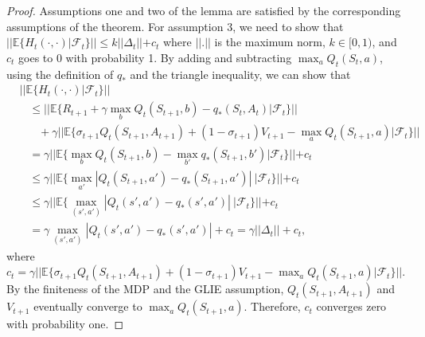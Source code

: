 \begin{proof}
Assumptions one and two of the lemma are satisfied by the corresponding assumptions of the theorem.
For assumption 3, we need to show that $||\mathbb{E}\{ H_t (\cdot, \cdot) | \mathcal{F}_t \}|| \leq k ||\Delta_t|| + c_t$ where $||.||$ is the maximum norm, $k \in [0,1)$, and $c_t$ goes to $0$ with probability 1. 
By adding and subtracting $\max_a Q_t(S_t,a)$, using the definition of $q_*$ and the triangle inequality, we can show that
%
\begin{align}
\label{eq:onestep_contraction_equation}
& ||\mathbb{E}\{H_t (\cdot, \cdot) | \mathcal{F}_t\}|| 
	\nonumber \\  
& \hspace{10pt} \leq 
	|| \mathbb{E}\{R_{t+1} + \gamma \max_{b} Q_{t}(S_{t+1}, b) - q_*(S_t,A_t)
	| \mathcal{F}_t \}|| 
    \nonumber \\
& \hspace{20pt} 
	+ \gamma || \mathbb{E}\{\sigma_{t+1} Q_t(S_{t+1}, A_{t+1}) + (1-\sigma_{t+1})V_{t+1} 
	- \max_a Q_{t}(S_{t+1},a) | \mathcal{F}_t \}|| 
    \nonumber \\
& \hspace{10pt} = 
	\gamma || \mathbb{E}\{\max_b Q_t(S_{t+1}, b) - \max_{b'} q_*(S_{t+1}, b') 
	| \mathcal{F}_t\}|| + c_t 
    \nonumber \\
& \hspace{10pt} \leq 
	\gamma || \mathbb{E} \{ \max_{a'} | Q_t(S_{t+1}, a') -  q_*(S_{t+1}, a')| \ 
    | \mathcal{F}_t  \} || + c_t 
    \nonumber \\
& \hspace{10pt} \leq
	\gamma || \mathbb{E} \{ \max_{(s', a')} | Q_t(s', a') - q_*(s', a')| \ 
    | \mathcal{F}_t \} || + c_t
    \nonumber \\
& \hspace{10pt} =
	\gamma \max_{(s', a')} | Q_t(s', a') - q_*(s', a')| + c_t 
	= \gamma ||\Delta_t|| + c_t,
\end{align}
%
where $c_t = \gamma || \mathbb{E} \{ \sigma_{t+1} Q_t(S_{t+1}, A_{t+1}) + (1-\sigma_{t+1}) V_{t+1} - \max_a Q_t (S_{t+1}, a) | \mathcal{F}_t \} ||$.
By the finiteness of the MDP and the GLIE assumption, $Q_t(S_{t+1}, A_{t+1})$ and $V_{t+1}$ eventually converge to $\max_a Q_t (S_{t+1}, a)$. 
Therefore, $c_t$ converges zero with probability one.


\end{proof}

